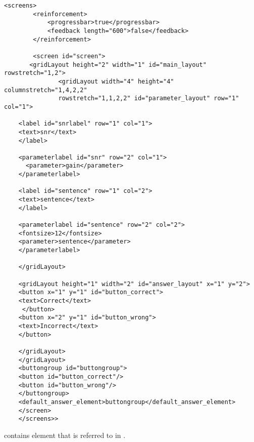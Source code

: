 \begin{lstlisting}
<screens>
        <reinforcement>
            <progressbar>true</progressbar>
            <feedback length="600">false</feedback>
        </reinforcement>

        <screen id="screen">
       <gridLayout height="2" width="1" id="main_layout" rowstretch="1,2">
               <gridLayout width="4" height="4" columnstretch="1,4,2,2"
               rowstretch="1,1,2,2" id="parameter_layout" row="1" col="1">

    <label id="snrlabel" row="1" col="1">
    <text>snr</text>
    </label>

    <parameterlabel id="snr" row="2" col="1">
      <parameter>gain</parameter>
    </parameterlabel>

    <label id="sentence" row="1" col="2">
    <text>sentence</text>
    </label>

    <parameterlabel id="sentence" row="2" col="2">
    <fontsize>12</fontsize>
    <parameter>sentence</parameter>
    </parameterlabel>

    </gridLayout>

    <gridLayout height="1" width="2" id="answer_layout" x="1" y="2">
    <button x="1" y="1" id="button_correct">
    <text>Correct</text>
     </button>
    <button x="2" y="1" id="button_wrong">
    <text>Incorrect</text>
    </button>

    </gridLayout>
    </gridLayout>
    <buttongroup id="buttongroup">
    <button id="button_correct"/>
    <button id="button_wrong"/>
    </buttongroup>
    <default_answer_element>buttongroup</default_answer_element>
    </screen>
    </screens>>
\end{lstlisting}

 contains  element that is
referred to in .

